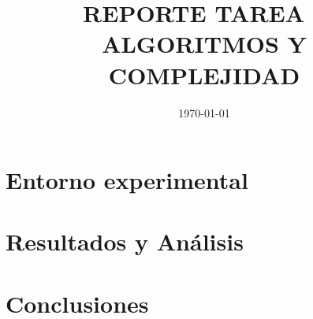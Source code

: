 \documentclass[11pt,spanish]{article} %
\author{\namestudent}
\title{
  \huge
  \textbf{REPORTE TAREA \tnum~ \\ ALGORITMOS Y COMPLEJIDAD} \\[1ex]
  \emph{\textquote{¿Quién ganará? Greedys vs Dinámico vs Bruto.}}
  }
\date{
  \small
  \today\\
  \currenttime
}
\begin{document}
\maketitle
\thispagestyle{fancy}
\vspace{-1.0\baselineskip}

\section{Entorno experimental}


\section{Resultados y Análisis}


\section{Conclusiones}


\printbibliography
\end{document}
